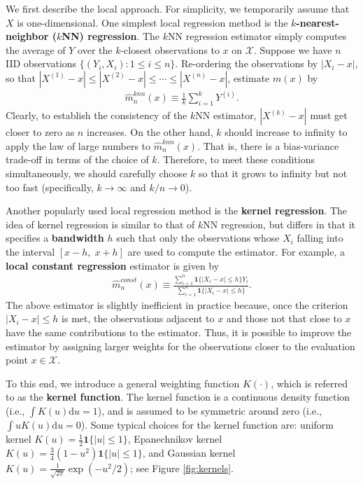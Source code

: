 \documentclass[11pt, A4paper, openany, uplatex]{book}
\begin{document}
We first describe the local approach.
For simplicity, we temporarily assume that $X$ is one-dimensional.
One simplest local regression method is the \textbf{$k$-nearest-neighbor ($k$NN) regression}.
The $k$NN regression estimator simply computes the average of $Y$ over the $k$-closest observations to $x$ on $\mathcal{X}$.
Suppose we have $n$ IID observations $\{(Y_i, X_i): 1 \le i \le n\}$.
Re-ordering the observations by $|X_i - x|$, so that $|X^{(1)} - x| \le |X^{(2)} - x| \le \cdots \le |X^{(n)} - x|$, estimate $m(x)$ by
\begin{align*}
	\hat m^{knn}_n(x) \equiv \frac{1}{k}\sum_{i = 1}^k Y^{(i)}.
\end{align*}
Clearly, to establish the consistency of the $k$NN estimator, $|X^{(k)} - x|$ must get closer to zero as $n$ increases.
On the other hand, $k$ should increase to infinity to apply the law of large numbers to $\hat m^{knn}_n(x)$. 
That is, there is a bias-variance trade-off in terms of the choice of $k$.
Therefore, to meet these conditions simultaneously, we should carefully choose $k$ so that it grows to infinity but not too fast (specifically, $k \to \infty$ and $k/n \to 0$).

Another popularly used local regression method is the \textbf{kernel regression}.
The idea of kernel regression is similar to that of $k$NN regression, but differs in that it specifies a \textbf{bandwidth} $h$ such that only the observations whose $X_i$ falling into the interval $[x-h, \; x+h]$ are used to compute the estimator.
For example, a \textbf{local constant regression} estimator is given by
\begin{align*}
	\hat m^{const}_n(x) \equiv \frac{\sum_{i = 1}^n \mathbf{1}\{|X_i - x | \le h\} Y_i}{\sum_{i = 1}^n\mathbf{1}\{|X_i - x | \le h\}}.
\end{align*}
The above estimator is slightly inefficient in practice because, once the criterion $|X_i - x | \le h$ is met, the observations adjacent to $x$ and those not that close to $x$ have the same contributions to the estimator.
Thus, it is possible to improve the estimator by assigning larger weights for the observations closer to the evaluation point $x \in \mathcal{X}$.

To this end, we introduce a general weighting function $K(\cdot)$, which is referred to as the \textbf{kernel function}.
The kernel function is a continuous density function (i.e., $\int K(u)\text{d}u = 1$), and is assumed to be symmetric around zero (i.e., $\int u K(u)\text{d}u = 0$).
Some typical choices for the kernel function are: uniform kernel $K(u) = \frac{1}{2}\mathbf{1}\{|u| \le 1\}$, Epanechnikov kernel $K(u) = \frac{3}{4}(1-u^2)\mathbf{1}\{|u| \le 1\}$, and Gaussian kernel $K(u) = \frac{1}{\sqrt{2\pi}}\exp(-u^2/2)$; see Figure \ref{fig:kernels}.
\end{document}
